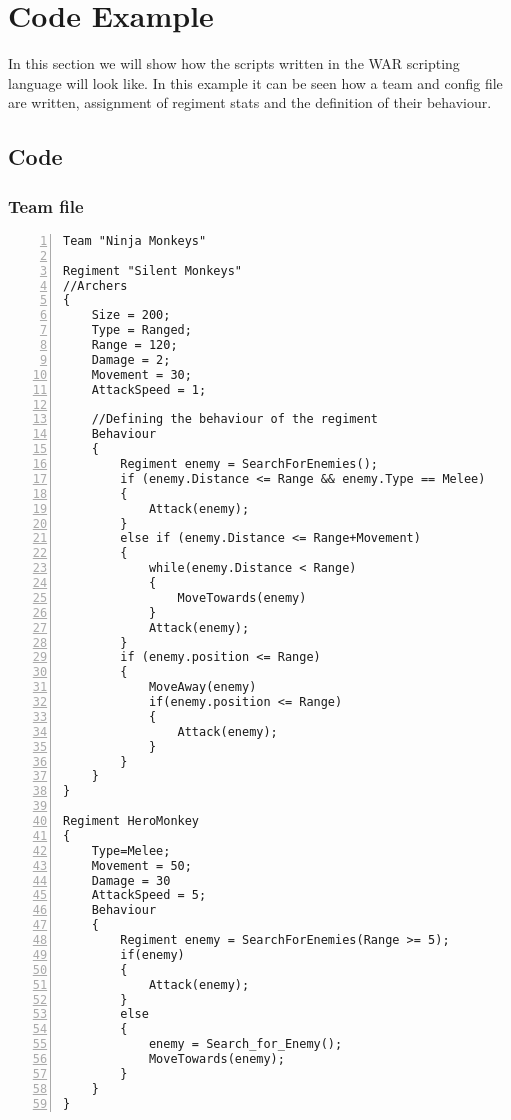 \section{Code Example}
	In this section we will show how the scripts written in the WAR scripting language will look like.
	In this example it can be seen how a team and config file are written, assignment of regiment stats and the definition of their behaviour.
	\subsection{Code}
		\subsubsection{Team file}
					\begin{lstlisting}[basicstyle=\small\sffamily,
					keywords={break,case,const,continue,default,else,enum,
					for,if,return,switch,while,do,long,void,int,float,double,
					char,struct,typedef,include,size\_t},
					keywordstyle={\color{blue}},
					comment={[l]{//}}, morecomment={[s]{/*}{*/}}, commentstyle=\itshape,
					columns={[l]flexible}, numbers=left, numberstyle=\tiny,
					frameround=fftt, frame=shadowbox, captionpos=b,
					caption={Team file},
					label=LST:code31]
Team "Ninja Monkeys"

Regiment "Silent Monkeys"
//Archers
{
	Size = 200;
	Type = Ranged;
	Range = 120;
	Damage = 2;
	Movement = 30;
	AttackSpeed = 1;
	
	//Defining the behaviour of the regiment
	Behaviour
	{
		Regiment enemy = SearchForEnemies();
		if (enemy.Distance <= Range && enemy.Type == Melee)
		{
			Attack(enemy);
		}
		else if (enemy.Distance <= Range+Movement)
		{
			while(enemy.Distance < Range)
			{
				MoveTowards(enemy)
			}
			Attack(enemy);
		}
		if (enemy.position <= Range)
		{
			MoveAway(enemy)
			if(enemy.position <= Range)
			{
				Attack(enemy);
			}
		}
	}
}

Regiment HeroMonkey
{
	Type=Melee;
	Movement = 50;
	Damage = 30
	AttackSpeed = 5;
	Behaviour
	{
		Regiment enemy = SearchForEnemies(Range >= 5);
		if(enemy)
		{
			Attack(enemy);
		}
		else
		{
			enemy = Search_for_Enemy();
			MoveTowards(enemy);
		}
	}
}
					\end{lstlisting}
